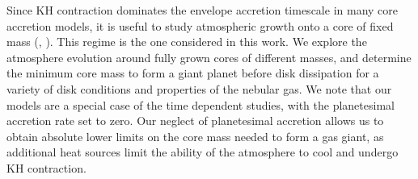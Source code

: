 \documentclass[apj, numberedappendix]{emulateapj}
\begin{document}


Since KH contraction dominates the envelope accretion timescale in many core accretion models, it is useful to study atmospheric growth onto a core of fixed mass (\citealt{ikoma00}, \citealt{pn05}). This regime is the one considered in this work. We explore the atmosphere evolution around fully grown cores of different masses, and determine the minimum core mass to form a giant planet before disk dissipation for a variety of disk conditions and properties of the nebular gas. We note that our models are a special case of the time dependent studies, with the planetesimal accretion rate set to zero. Our neglect of planetesimal accretion allows us to obtain absolute lower limits on the core mass needed to form a gas giant, as additional heat sources limit the ability of the atmosphere to cool and undergo KH contraction.



\end{document}
